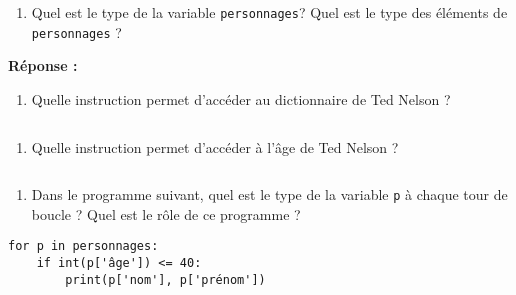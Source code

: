 \documentclass[12pt]{book}
\begin{document}
    \begin{enumerate}
\def\labelenumi{\arabic{enumi}.}
\tightlist
\item
  Quel est le type de la variable \texttt{personnages}? Quel est le type
  des éléments de \texttt{personnages} ?
\end{enumerate}

    \textbf{Réponse :}

    \begin{enumerate}
\def\labelenumi{\arabic{enumi}.}
\setcounter{enumi}{1}
\tightlist
\item
  Quelle instruction permet d'accéder au dictionnaire de Ted Nelson ?
\end{enumerate}

    \begin{tcolorbox}[breakable, size=fbox, boxrule=1pt, pad at break*=1mm,colback=cellbackground, colframe=cellborder]
\begin{Verbatim}[commandchars=\\\{\}]

\end{Verbatim}
\end{tcolorbox}

    \begin{enumerate}
\def\labelenumi{\arabic{enumi}.}
\setcounter{enumi}{2}
\tightlist
\item
  Quelle instruction permet d'accéder à l'âge de Ted Nelson ?
\end{enumerate}

    \begin{tcolorbox}[breakable, size=fbox, boxrule=1pt, pad at break*=1mm,colback=cellbackground, colframe=cellborder]
\begin{Verbatim}[commandchars=\\\{\}]

\end{Verbatim}
\end{tcolorbox}

    \begin{enumerate}
\def\labelenumi{\arabic{enumi}.}
\setcounter{enumi}{3}
\tightlist
\item
  Dans le programme suivant, quel est le type de la variable \texttt{p}
  à chaque tour de boucle ? Quel est le rôle de ce programme ?\\
\end{enumerate}

\begin{verbatim}
for p in personnages:
    if int(p['âge']) <= 40:
        print(p['nom'], p['prénom'])
\end{verbatim}
\end{document}
